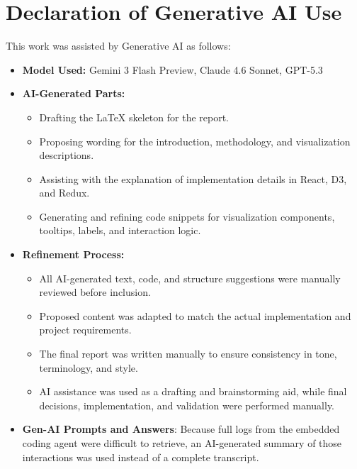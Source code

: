 \documentclass[11pt]{article}
\begin{document}
\section{Declaration of Generative AI Use}

This work was assisted by Generative AI as follows:

\begin{itemize}
    \item \textbf{Model Used:} Gemini 3 Flash Preview, Claude 4.6 Sonnet, GPT-5.3
    \item \textbf{AI-Generated Parts:}
    \begin{itemize}
        \item Drafting the LaTeX skeleton for the report.
        \item Proposing wording for the introduction, methodology, and visualization descriptions.
        \item Assisting with the explanation of implementation details in React, D3, and Redux.
        \item Generating and refining code snippets for visualization components, tooltips, labels, and interaction logic.
    \end{itemize}
    \item \textbf{Refinement Process:}
    \begin{itemize}
        \item All AI-generated text, code, and structure suggestions were manually reviewed before inclusion.
        \item Proposed content was adapted to match the actual implementation and project requirements.
        \item The final report was written manually to ensure consistency in tone, terminology, and style.
        \item AI assistance was used as a drafting and brainstorming aid, while final decisions, implementation, and validation were performed manually.
    \end{itemize}
\item \textbf{Gen-AI Prompts and Answers}: Because full logs from the embedded coding agent were difficult to retrieve, an AI-generated summary of those interactions was used instead of a complete transcript.
\end{itemize}
\end{document}
